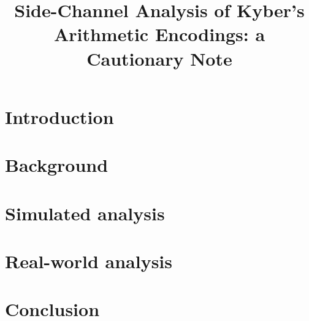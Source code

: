 \documentclass{llncs}
\begin{document}
 

\title{Side-Channel Analysis of Kyber's	Arithmetic Encodings: a Cautionary Note}
\maketitle

\begin{abstract}

\end{abstract}


\section{Introduction}


\section{Background}\label{sec:modes}



\section{Simulated analysis} 

\section{Real-world analysis}


\section{Conclusion}



%
%
\end{document}
